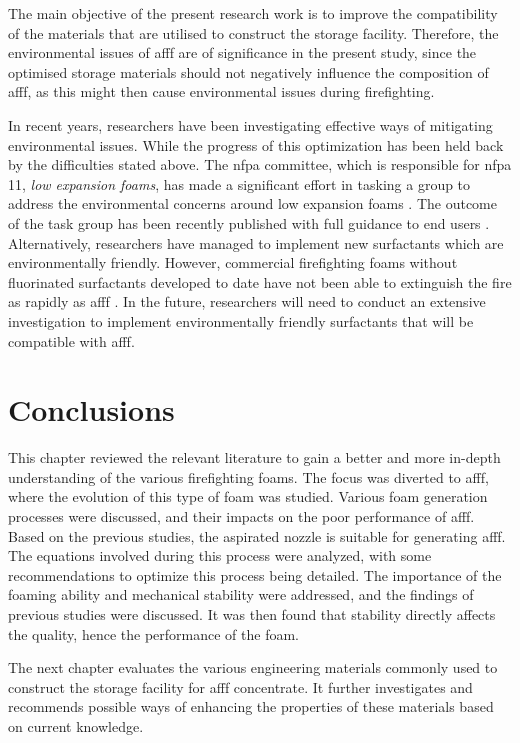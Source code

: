 The main objective of the present research work is to improve the compatibility of the materials that are utilised to construct the storage facility. Therefore, the environmental issues of \acrshort{afff} are of significance in the present study, since the optimised storage materials should not negatively influence the composition of \acrshort{afff}, as this might then cause environmental issues during firefighting.  

In recent years, researchers have been investigating effective ways of mitigating environmental issues. While the progress of this optimization has been held back by the difficulties stated above. The \acrshort{nfpa} committee, which is responsible for \acrshort{nfpa} 11, \emph{low expansion foams}, has made a significant effort in tasking a group to address the environmental concerns around low expansion foams \cite{scheffey1995evaluating}. The outcome of the task group has been recently published with full guidance to end users \cite{scheffey1995evaluating}. Alternatively, researchers have managed to implement new surfactants which are environmentally friendly. However, commercial firefighting foams without fluorinated surfactants developed to date have not been able to extinguish the fire as rapidly as \acrshort{afff} \cite{hinnant2017influence}. In the future, researchers will need to conduct an extensive investigation to implement environmentally friendly surfactants that will be compatible with \acrshort{afff}.

\section{Conclusions}
This chapter reviewed the relevant literature to gain a better and more in-depth understanding of the various firefighting foams. The focus was diverted to \acrshort{afff}, where the evolution of this type of foam was studied. Various foam generation processes were discussed, and their impacts on the poor performance of \acrshort{afff}. Based on the previous studies, the aspirated nozzle is suitable for generating \acrshort{afff}. The equations involved during this process were analyzed, with some recommendations to optimize this process being detailed. The importance of the foaming ability and mechanical stability were addressed, and the findings of previous studies were discussed. It was then found that stability directly affects the quality, hence the performance of the foam.  

The next chapter evaluates the various engineering materials commonly used to construct the storage facility for \acrshort{afff} concentrate. It further investigates and recommends possible ways of enhancing the properties of these materials based on current knowledge. 